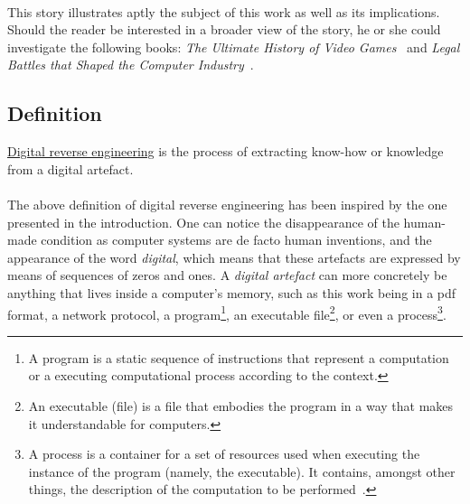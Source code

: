 \paragraph{}
This story illustrates aptly the subject of this work as well as its implications. Should the reader be interested in a broader view of the story, he or she could investigate the following books: \textit{The Ultimate History of Video Games}~\cite{Kent:2001:UHV:559522} and \textit{Legal Battles that Shaped the Computer Industry}~\cite{graham1999legal}.

\subsection{Definition}
\begin{framed}
	\begin{definition} 
		\underline{Digital reverse engineering} is the process of extracting know-how or knowledge from a digital artefact.
	\end{definition}
\end{framed}

\paragraph{}
The above definition of digital reverse engineering has been inspired by the one presented in the introduction. One can notice the disappearance of the human-made condition as computer systems are de facto human inventions, and the appearance of the word \textit{digital}, which means that these artefacts are expressed by means of sequences of zeros and ones. A \textit{digital artefact} can more concretely be anything that lives inside a computer's memory, such as this work being in a pdf format, a network protocol, a program\footnote{A program is a static sequence of instructions that represent a computation~\cite{russinovich2012windows} or a executing computational process according to the context.}, an executable file\footnote{An executable (file) is a file that embodies the program in a way that makes it understandable for computers.}, or even a process\footnote{A process is a container for a set of resources used when executing the instance of the program (namely, the executable). It contains, amongst other things, the description of the computation to be performed~\cite{russinovich2012windows}.}.


